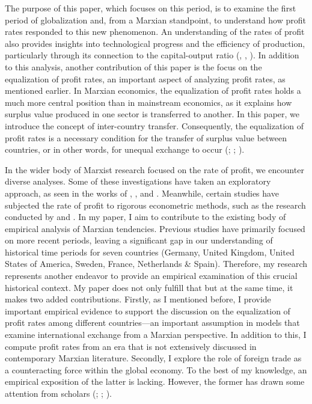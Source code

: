 \documentclass[10pt]{article}
\begin{document}
\par The purpose of this paper, which focuses on this period, is to examine the first period of globalization and, from a Marxian standpoint, to understand how profit rates responded to this new phenomenon. An understanding of the rates of profit also provides insights into technological progress and the efficiency of production, particularly through its connection to the capital-output ratio (\citet{weisskopf1979marxian}, \citet{basu2013technology}, \citet{kaldor1956alternative}). In addition to this analysis, another contribution of this paper is the focus on the equalization of profit rates, an important aspect of analyzing profit rates, as mentioned earlier. In Marxian economics, the equalization of profit rates holds a much more central position than in mainstream economics, as it explains how surplus value produced in one sector is transferred to another. In this paper, we introduce the concept of inter-country transfer. Consequently, the equalization of profit rates is a necessary condition for the transfer of surplus value between countries, or in other words, for unequal exchange to occur (\citet{carchedi2021economics}; \citet{Ricci2019}; \citet{emmanuel1972unequal}).
\par In the wider body of Marxist research focused on the rate of profit, we encounter diverse analyses. Some of these investigations have taken an exploratory approach, as seen in the works of \citet{Wolff1979}, \citet{Shaikh1992}, and \citet{Moseley1991}. Meanwhile, certain studies have subjected the rate of profit to rigorous econometric methods, such as the research conducted by \citet{BasuManolakos2013} and \citet{Alexiou2022}. In my paper, I aim to contribute to the existing body of empirical analysis of Marxian tendencies. Previous studies have primarily focused on more recent periods, leaving a significant gap in our understanding of historical time periods for seven countries (Germany, United Kingdom, United States of America, Sweden, France, Netherlands \& Spain). Therefore, my research represents another endeavor to provide an empirical examination of this crucial historical context. My paper does not only fulfill that but at the same time, it makes two added contributions. Firstly, as I mentioned before, I provide important empirical evidence to support the discussion on the equalization of profit rates among different countries—an important assumption in models that examine international exchange from a Marxian perspective. In addition to this, I compute profit rates from an era that is not extensively discussed in contemporary Marxian literature. Secondly, I explore the role of foreign trade as a counteracting force within the global economy. To the best of my knowledge, an empirical exposition of the latter is lacking. However, the former has drawn some attention from scholars (\citet{ChouIzyumovVahaly2015}; \citet{Carter2004}; \citet{Glyn2004}). 
\end{document}
